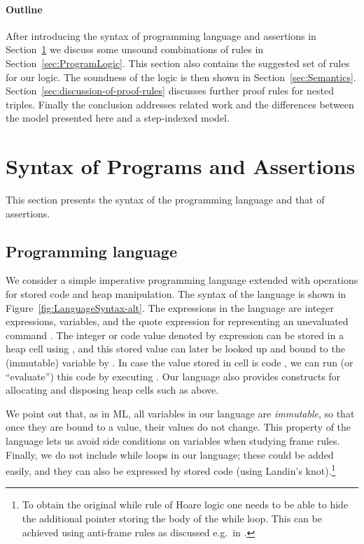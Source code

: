 \documentclass{LMCS}
\theoremstyle{remark}
\begin{document}
\paragraph{Outline} After introducing the syntax of programming language and assertions in Section~\ref{sec:syntax} we discuss some unsound combinations of rules in Section~\ref{sec:ProgramLogic}. This section also contains the suggested set of rules for our logic.   The soundness of the logic is then shown  in Section~\ref{sec:Semantics}.
Section~\ref{sec:discussion-of-proof-rules} discusses further proof rules for nested triples. Finally the conclusion  addresses  related work and   the differences between the model presented here and a step-indexed model.


\section{Syntax of Programs and Assertions}
\label{sec:syntax}
 
This section presents the syntax of the programming language and that of assertions.

\subsection{Programming language}
We consider a simple imperative programming language extended with operations for 
stored code and heap manipulation. The syntax of the language is shown in 
Figure~\ref{fig:LanguageSyntax-alt}. The expressions in the language are
integer expressions, variables, and the quote expression
 for representing an unevaluated command . The integer
or code value denoted by expression  can be stored in a heap cell
 using , and this stored value can later be looked up
and bound to the (immutable) variable  by .
In case the value stored in cell  is code , we can
run (or ``evaluate'') this code by executing . Our language also
provides constructs for allocating and disposing heap cells such as 
above. 

We point out that, as in ML, all variables  in
our language are \emph{immutable}, so that once they are bound to a value, their values do not change. 
This property of the language lets us avoid side conditions on variables when studying frame rules.
Finally, we do not include while loops in our language; these could be added easily, and they can also be expressed by stored code (using Landin's knot).\footnote{To obtain the original while rule of Hoare logic one needs to be able to hide the additional pointer storing the body of the while loop. This can be achieved  using anti-frame rules as discussed e.g.\ in \cite{schwinghammerYBPR10}.}
 
\end{document}
